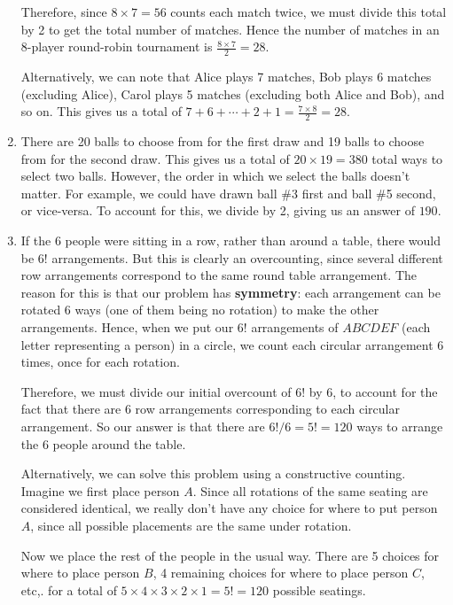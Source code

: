 \documentclass[12pt, letterpaper]{article}
\begin{document}
\begin{enumerate}
    Therefore, since $8\times7 = 56$ counts each match twice, we must divide this total by 2 to get the total number of matches. Hence the number of matches in an 8-player round-robin tournament is $\frac{8\times7}{2}=\boxed{28}$.
    
    Alternatively, we can note that Alice plays 7 matches, Bob plays 6 matches (excluding Alice), Carol plays 5 matches (excluding both Alice and Bob), and so on. This gives us a total of $7+6+\cdots+2+1=\frac{7\times8}{2}=\boxed{28}$.
    \item There are 20 balls to choose from for the first draw and 19 balls to choose from for the second draw. This gives us a total of $20\times19=380$ total ways to select two balls. However, the order in which we select the balls doesn't matter. For example, we could have drawn ball \#3 first and ball \#5 second, or vice-versa. To account for this, we divide by 2, giving us an answer of $\boxed{190}$.
    \item If the 6 people were sitting in a row, rather than around a table, there would be $6!$ arrangements. But this is clearly an overcounting, since several different row arrangements correspond to the same round table arrangement. The reason for this is that our problem has \textbf{symmetry}: each arrangement can be rotated 6 ways (one of them being no rotation) to make the other arrangements. Hence, when we put our $6!$ arrangements of $ABCDEF$ (each letter representing a person) in a circle, we count each circular arrangement 6 times, once for each rotation.
    
    Therefore, we must divide our initial overcount of $6!$ by 6, to account for the fact that there are 6 row arrangements corresponding to each circular arrangement. So our answer is that there are $6!/6 = 5!=\boxed{120}$ ways to arrange the 6 people around the table.
    
    Alternatively, we can solve this problem using a constructive counting. Imagine we first place person $A$. Since all rotations of the same seating are considered identical, we really don't have any choice for where to put person $A$, since all possible placements are the same under rotation.
    
    Now we place the rest of the people in the usual way. There are 5 choices for where to place person $B$, 4 remaining choices for where to place person $C$, etc,. for a total of $5\times4\times3\times2\times1=5!=\boxed{120}$ possible seatings.
\end{enumerate}
\end{document}
